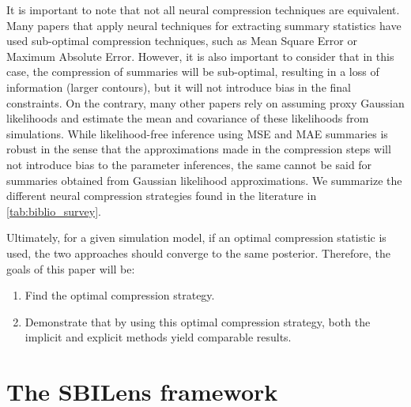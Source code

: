 \documentclass{aa}
\begin{document}
It is important to note that not all neural compression techniques are equivalent. Many papers that apply neural techniques for extracting summary statistics have used sub-optimal compression techniques, such as Mean Square Error or Maximum Absolute Error.
However, it is also important to consider that in this case, the compression of summaries will be sub-optimal, resulting in a loss of information (larger contours), but it will not introduce bias in the final constraints. On the contrary, many other papers rely on assuming proxy Gaussian likelihoods and estimate the mean and covariance of these likelihoods from simulations. While likelihood-free inference using MSE and MAE summaries is robust in the sense that the approximations made in the compression steps will not introduce bias to the parameter inferences, the same cannot be said for summaries obtained from Gaussian likelihood approximations.
We summarize the different neural compression strategies found in the literature in \autoref{tab:biblio_survey}.

\vspace{1cm}
Ultimately, for a given simulation model, if an optimal compression statistic is used, the two approaches should converge to the same posterior. Therefore, the goals of this paper will be:
\begin{enumerate}
    \item Find the optimal compression strategy.
    \item Demonstrate that by using this optimal compression strategy, both the implicit and explicit methods yield comparable results.
\end{enumerate}


\section{The SBILens framework}\label{Sec:the SBILens framework}
\end{document}
